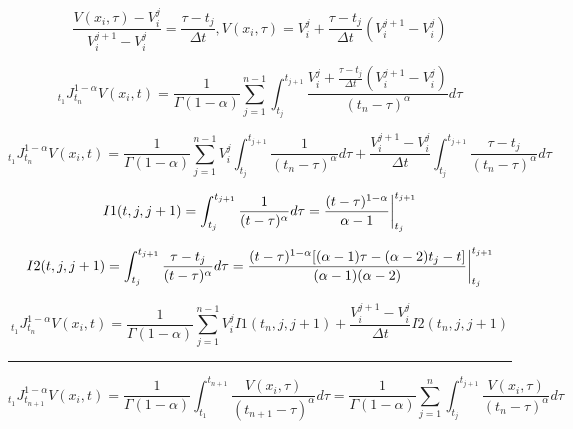 \documentclass[12pt, a4paper]{article}
\newcommand {\dt} {\Delta t}
\begin{document}
	\begin{equation}
	\frac{V(x_{i},\tau) - V_{i}^{j}}{V_{i}^{j+1} - V_{i}^{j}} = \frac{\tau - t_{j}}{\dt},
	V(x_{i},\tau) = V_{i}^{j} + \frac{\tau - t_{j}}{\dt} (V_{i}^{j+1} - V_{i}^{j})
	\end{equation}
	
	\begin{equation}
	 {}_{t_{1}}J^{1-\alpha}_{t_{n}}V(x_{i},t)
	 = \frac{1}{\Gamma(1-\alpha)} \sum_{j = 1}^{n-1} \int_{t_{j}}^{t_{j+1}} \frac{V_{i}^{j} + \frac{\tau - t_{j}}{\dt} (V_{i}^{j+1} - V_{i}^{j})}{(t_{n} - \tau)^{\alpha}} d\tau
	\end{equation}

	\begin{equation}
	 {}_{t_{1}}J^{1-\alpha}_{t_{n}}V(x_{i},t)
	 = \frac{1}{\Gamma(1-\alpha)} \sum_{j = 1}^{n-1} V_{i}^{j} \int_{t_{j}}^{t_{j+1}} \frac{1}{(t_{n} - \tau)^{\alpha}} d\tau
	 + \frac{V_{i}^{j+1} - V_{i}^{j}}{\dt} \int_{t_{j}}^{t_{j+1}} \frac{ \tau - t_{j} }{(t_{n} - \tau)^{\alpha}} d\tau
	\end{equation}
	
	\begin{equation}
	I1(t, j, j+1) = \int_{t_{j}}^{t_{j+1}} \frac{1}{(t - \tau)^{\alpha}} d\tau = \frac{(t - \tau)^{1 - \alpha}}{\alpha - 1} \bigg{|}_{t_{j}}^{t_{j+1}}
	\end{equation}
	
	\begin{equation}
	I2(t, j, j+1) = \int_{t_{j}}^{t_{j+1}} \frac{ \tau - t_{j} }{(t - \tau)^{\alpha}} d\tau = \frac{(t - \tau)^{1 - \alpha}[(\alpha - 1)\tau - (\alpha - 2)t_{j} - t]}{(\alpha - 1)(\alpha - 2)} \bigg{|}_{t_{j}}^{t_{j+1}}
	\end{equation}
	
	\begin{equation}
	 {}_{t_{1}}J^{1-\alpha}_{t_{n}}V(x_{i},t)
	 = \frac{1}{\Gamma(1-\alpha)} \sum_{j = 1}^{n-1} V_{i}^{j} I1(t_{n}, j, j+1)
	 + \frac{V_{i}^{j+1} - V_{i}^{j}}{\dt} I2(t_{n}, j, j+1)
	\end{equation}
	
\noindent\rule{\linewidth}{0.4pt}
	\begin{equation}
	{}_{t_{1}}J^{1-\alpha}_{t_{n+1}}V(x_{i},t)
	 = \frac{1}{\Gamma(1-\alpha)} \int_{t_{1}}^{t_{n+1}} \frac{V(x_{i},\tau)}{(t_{n+1} - \tau)^{\alpha}} d\tau
	 = \frac{1}{\Gamma(1-\alpha)} \sum_{j = 1}^{n} \int_{t_{j}}^{t_{j+1}} \frac{V(x_{i},\tau)}{(t_{n} - \tau)^{\alpha}} d\tau
	\end{equation}
	
\end{document}
